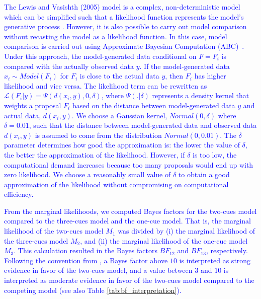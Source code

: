 \documentclass[a4paper, man, floatsintext]{apa7}
\begin{document}
{\textcolor{blue}{The Lewis and Vasishth (2005) model is a complex, non-deterministic model which can be simplified such that a likelihood function represents the model's generative process  \parencite[e.g., in][]{NicenboimRetrieval2018,lisson2020computational}. However, it is also possible to carry out model comparison without recasting the model as a likelihood function. In this case, model comparison is carried out using Approximate Bayesian Computation (ABC)~\citep{sisson2018handbook,palestro2018likelihood}. Under this approach, the model-generated data conditional on $F=F_i$ is compared with the actually observed data $y$. If the model-generated data $x_{i} \sim Model(F_i)$ for $F_i$ is close to the actual data $y$, then $F_i$ has higher likelihood and vice versa. The likelihood term can be rewritten as $\mathcal{L}(F_i|y) = \Psi(d(x_i, y), 0 , \delta)$, where $\Psi(.|\delta)$ represents a density kernel that weights a proposal $F_i$ based on the distance between model-generated data $y$ and actual data, $d(x_i,y)$. We choose a Gaussian kernel, $Normal(0,\delta)$ where $\delta=0.01$, such that the distance between model-generated data and observed data $d(x_i,y)$ is assumed to come from the distribution $Normal(0,0.01)$. The $\delta$ parameter determines how good the approximation is: the lower the value of $\delta$, the better the approximation of the likelihood. However, if $\delta$ is too low, the computational demand increases because too many proposals would end up with zero likelihood. We choose a reasonably small value of $\delta$ to obtain a good approximation of the likelihood without compromising on computational efficiency.}

\textcolor{blue}{From the marginal likelihoods, we computed Bayes factors for the two-cues model compared to the three-cues model and the one-cue model. That is, the marginal likelihood of the two-cues model $M_1$ was divided by (i) the marginal likelihood of the three-cues model $M_2$,  and (ii) the marginal likelihood of the one-cue model $M_3$. This calculation resulted in the Bayes factors $BF_{12}$ and $BF_{13}$, respectively. Following the convention from \textcite{jeffreys1998theory}, a Bayes factor above $10$ is interpreted as strong evidence in favor of the two-cues model, and a value between $3$ and $10$ is interpreted as moderate evidence in favor of the two-cues model compared to the competing model (see also Table \ref{tab:bf_interpretation}).}

}
\end{document}
